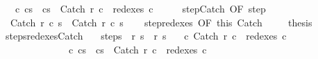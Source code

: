 \begin{isabellebody}
\ \ \ {\isachardoublequoteopen}{\isasymexists}c{\isacharprime}{\isachardot}\ {\isasymGamma}{\isasymturnstile}{\isacharparenleft}c{\isacharcomma}s{\isacharparenright}\ {\isasymrightarrow}\ {\isacharparenleft}c{\isacharprime}{\isacharcomma}s{\isacharprime}{\isacharparenright}\ {\isasymand}\ Catch\ r{\isacharprime}\ c\ {\isasymin}\ redexes\ c{\isacharprime}{\isachardoublequoteclose}\isanewline
%
\isadelimproof
%
\endisadelimproof
%
\isatagproof
{}\isamarkupfalse%
\ {\isacharminus}\isanewline
\ \ \isamarkupfalse%
\ step{\isachardot}Catch\ {\isacharbrackleft}OF\ step{\isacharbrackright}\isanewline
\ \ \isamarkupfalse%
\ {\isachardoublequoteopen}{\isasymGamma}{\isasymturnstile}\ {\isacharparenleft}Catch\ r\ c\ s{\isacharparenright}\ {\isasymrightarrow}\ {\isacharparenleft}Catch\ r{\isacharprime}\ c\ s{\isacharprime}{\isacharparenright}{\isachardoublequoteclose}\isacommand{{\isachardot}}\isamarkupfalse%
\isanewline
\ \ \isamarkupfalse%
\ step{\isacharunderscore}redexes\ {\isacharbrackleft}OF\ this\ Catch{\isacharbrackright}\ \isanewline
\ \ \isamarkupfalse%
\ {\isacharquery}thesis\ \isacommand{{\isachardot}}\isamarkupfalse%
\isanewline
{}\isamarkupfalse%
%
\endisatagproof
{\isafoldproof}%
%
\isadelimproof
\isanewline
%
\endisadelimproof
\isanewline
{}\isamarkupfalse%
\ steps{\isacharunderscore}redexes{\isacharunderscore}Catch{\isacharcolon}\isanewline
\ \ \ steps{\isacharcolon}\ {\isachardoublequoteopen}{\isasymGamma}{\isasymturnstile}\ {\isacharparenleft}r{\isacharcomma}\ s{\isacharparenright}\ {\isasymrightarrow}\isactrlsup {\isacharasterisk}\ {\isacharparenleft}r{\isacharprime}{\isacharcomma}\ s{\isacharprime}{\isacharparenright}{\isachardoublequoteclose}\isanewline
\ \ \ {\isachardoublequoteopen}{\isasymAnd}c{\isachardot}\ Catch\ r\ c\ {\isasymin}\ redexes\ c\ {\isasymLongrightarrow}\ \isanewline
\ \ \ \ \ \ \ \ \ \ \ \ \ \ {\isasymexists}c{\isacharprime}{\isachardot}\ {\isasymGamma}{\isasymturnstile}{\isacharparenleft}c{\isacharcomma}s{\isacharparenright}\ {\isasymrightarrow}\isactrlsup {\isacharasterisk}\ {\isacharparenleft}c{\isacharprime}{\isacharcomma}s{\isacharprime}{\isacharparenright}\ {\isasymand}\ Catch\ r{\isacharprime}\ c\ {\isasymin}\ redexes\ c{\isacharprime}{\isachardoublequoteclose}\isanewline
%
\isadelimproof
%
\endisadelimproof

\end{isabellebody}
